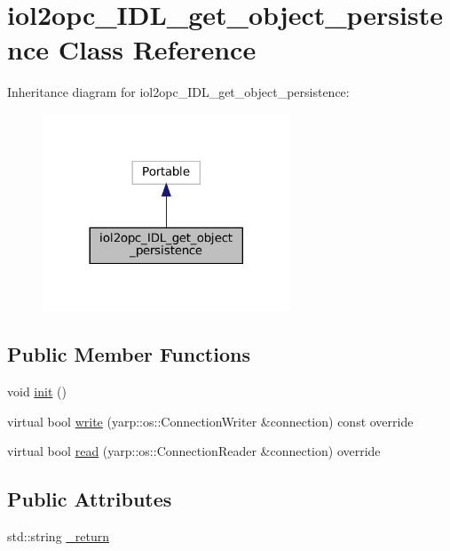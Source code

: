 \hypertarget{classiol2opc__IDL__get__object__persistence}{}\section{iol2opc\+\_\+\+I\+D\+L\+\_\+get\+\_\+object\+\_\+persistence Class Reference}
\label{classiol2opc__IDL__get__object__persistence}


Inheritance diagram for iol2opc\+\_\+\+I\+D\+L\+\_\+get\+\_\+object\+\_\+persistence\+:
\nopagebreak
\begin{figure}[H]
\begin{center}
\leavevmode
\includegraphics[width=209pt]{classiol2opc__IDL__get__object__persistence__inherit__graph}
\end{center}
\end{figure}
\subsection*{Public Member Functions}
\begin{DoxyCompactItemize}
\item 
void \hyperlink{classiol2opc__IDL__get__object__persistence_accb53caf6c8d265acc24a9012da7328a}{init} ()
\item 
virtual bool \hyperlink{classiol2opc__IDL__get__object__persistence_a72b9fff1b3d9a01ec83d979b4080a71b}{write} (yarp\+::os\+::\+Connection\+Writer \&connection) const override
\item 
virtual bool \hyperlink{classiol2opc__IDL__get__object__persistence_aac75f4660bcb0e7a0eb040dce55a11b2}{read} (yarp\+::os\+::\+Connection\+Reader \&connection) override
\end{DoxyCompactItemize}
\subsection*{Public Attributes}
\begin{DoxyCompactItemize}
\item 
std\+::string \hyperlink{classiol2opc__IDL__get__object__persistence_a5d58210682766024c57668203d8a6270}{\+\_\+return}
\end{DoxyCompactItemize}



